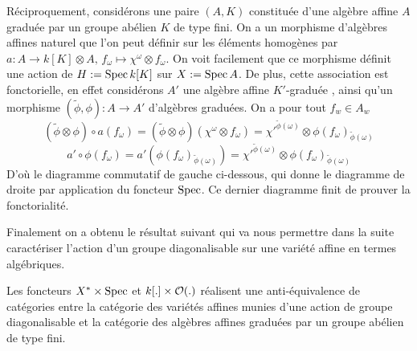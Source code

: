 Réciproquement, considérons une paire $(A, K)$ constituée d'une algèbre affine $A$ graduée par un groupe abélien $K$ de type fini. On a un morphisme d'algèbres affines naturel que l'on peut définir sur les éléments homogènes par $a:A\rightarrow k[K]\otimes A,\, f_{\omega}\mapsto \chi^{\omega}\otimes f_{\omega}$. On voit facilement que ce morphisme définit une action de $H:=\operatorname{Spec} k[K]$ sur $X:=\operatorname{Spec} A$. De plus, cette association est fonctorielle, en effet considérons $A'$ une algèbre affine $K'$-graduée , ainsi qu'un morphisme $(\widetilde{\phi},\phi):A\rightarrow A'$ d'algèbres graduées. On a pour tout $f_w\in A_w$
$$(\widetilde{\phi}\otimes \phi)\circ a(f_\omega)=(\widetilde{\phi}\otimes \phi)(\chi^{\omega}\otimes f_\omega) = \chi'^{\widetilde{\phi}(\omega)}\otimes \phi(f_\omega)_{\widetilde{\phi}(\omega)}$$ 
$$a'\circ \phi(f_\omega)=a'(\phi(f_\omega)_{\widetilde{\phi}(\omega)})=\chi'^{\widetilde{\phi}(\omega)}\otimes \phi(f_\omega)_{\widetilde{\phi}(\omega)}$$
D'où le diagramme commutatif de gauche ci-dessous, qui donne le diagramme de droite par application du foncteur $\operatorname{Spec}$. Ce dernier diagramme finit de prouver la fonctorialité.
\begin{multicols}{2}
	\begin{center}
	\end{center}

	\columnbreak
	\begin{center}
	\end{center}
\end{multicols}

Finalement on a obtenu le résultat suivant qui va nous permettre dans la suite caractériser l'action d'un groupe diagonalisable sur une variété affine en termes algébriques.

\begin{prop}
Les foncteurs $X^*\times\operatorname{Spec}$ et $k[.]\times\mathcal{O}(.)$ réalisent une anti-équivalence de catégories entre la catégorie des variétés affines munies d'une action de groupe diagonalisable et la catégorie des algèbres affines graduées par un groupe abélien de type fini. 
\end{prop}


